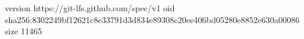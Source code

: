 version https://git-lfs.github.com/spec/v1
oid sha256:8302249bf12621c8e33791d3d834e89308c20ee406bd05280e8852e630a00086
size 11465
